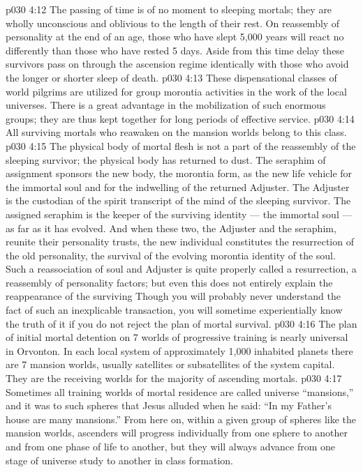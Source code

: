 \vs p030 4:12 The passing of time is of no moment to sleeping mortals; they are wholly unconscious and oblivious to the length of their rest. On reassembly of personality at the end of an age, those who have slept 5,000 years will react no differently than those who have rested 5 days. Aside from this time delay these survivors pass on through the ascension regime identically with those who avoid the longer or shorter sleep of death.
\vs p030 4:13 These dispensational classes of world pilgrims are utilized for group morontia activities in the work of the local universes. There is a great advantage in the mobilization of such enormous groups; they are thus kept together for long periods of effective service.
\vs p030 4:14 \bibnobreakspace {} All surviving mortals who reawaken on the mansion worlds belong to this class.
\vs p030 4:15 The physical body of mortal flesh is not a part of the reassembly of the sleeping survivor; the physical body has returned to dust. The seraphim of assignment sponsors the new body, the morontia form, as the new life vehicle for the immortal soul and for the indwelling of the returned Adjuster. The Adjuster is the custodian of the spirit transcript of the mind of the sleeping survivor. The assigned seraphim is the keeper of the surviving identity --- the immortal soul --- as far as it has evolved. And when these two, the Adjuster and the seraphim, reunite their personality trusts, the new individual constitutes the resurrection of the old personality, the survival of the evolving morontia identity of the soul. Such a reassociation of soul and Adjuster is quite properly called a resurrection, a reassembly of personality factors; but even this does not entirely explain the reappearance of the surviving  Though you will probably never understand the fact of such an inexplicable transaction, you will sometime experientially know the truth of it if you do not reject the plan of mortal survival.
\vs p030 4:16 \pc The plan of initial mortal detention on 7 worlds of progressive training is nearly universal in Orvonton. In each local system of approximately 1,000 inhabited planets there are 7 mansion worlds, usually satellites or subsatellites of the system capital. They are the receiving worlds for the majority of ascending mortals.
\vs p030 4:17 Sometimes all training worlds of mortal residence are called universe “mansions,” and it was to such spheres that Jesus alluded when he said: “In my Father’s house are many mansions.” From here on, within a given group of spheres like the mansion worlds, ascenders will progress individually from one sphere to another and from one phase of life to another, but they will always advance from one stage of universe study to another in class formation.
